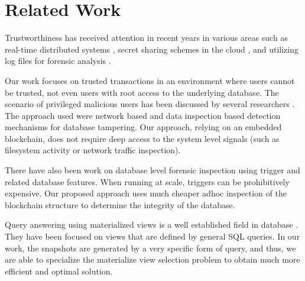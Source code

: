 \section{Related Work}

Trustworthiness has received attention in recent years in various areas
such as real-time distributed systems \cite{khayat2017trust}, secret
sharing schemes in the cloud \cite{dutta2013privacy}, and utilizing log files
for forensic analysis \cite{sinha2014continuous}.  

Our work focuses on trusted
transactions in an environment where users cannot be trusted, not even users
with root access to the underlying database. The scenario of privileged
malicious users has been discussed by several researchers
\cite{crosby2009tamper-evident,wagner2018detect,wanger2017carving}. The approach
used were network based and data inspection based detection mechanisms for
database tampering.  Our approach, relying on an embedded blockchain, does not
require deep access to the system level signals (such as filesystem activity or
network traffic inspection).

There have also been work on database level forensic inspection
\cite{fabbri2013select,hauger2014information} using trigger and related database
features.  When running at scale, triggers can be prohibitively expensive.  Our
proposed approach uses much cheaper adhoc inspection of the blockchain structure
to determine the integrity of the database.

Query answering using materialized views is a well established field in database
\cite{du2017deepsea,sohrabi2016materialized,shukla1998materialized,aouiche2006clustering}.
They have been focused on views that are defined by general SQL queries.  In our
work, the snapshots are generated by a very specific form of query, and thus, we
are able to specialize the materialize view selection problem to obtain much
more efficient and optimal solution.
